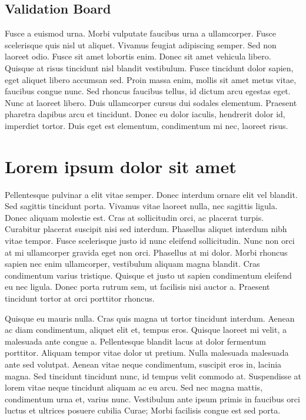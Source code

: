 \subsection{Validation Board}\label{sec:LABEL_CHP_1_SEC_B}
Fusce a euismod urna. Morbi vulputate faucibus urna a ullamcorper. Fusce scelerisque quis nisl ut aliquet. Vivamus feugiat adipiscing semper. Sed non laoreet odio. Fusce sit amet lobortis enim. Donec sit amet vehicula libero. Quisque at risus tincidunt nisl blandit vestibulum. Fusce tincidunt dolor sapien, eget aliquet libero accumsan sed. Proin massa enim, mollis sit amet metus vitae, faucibus congue nunc. Sed rhoncus faucibus tellus, id dictum arcu egestas eget. Nunc at laoreet libero. Duis ullamcorper cursus dui sodales elementum. Praesent pharetra dapibus arcu et tincidunt. Donec eu dolor iaculis, hendrerit dolor id, imperdiet tortor. Duis eget est elementum, condimentum mi nec, laoreet risus.


\section{Lorem ipsum dolor sit amet}\label{sec:LABEL_CHP_1_SEC_G}
Pellentesque pulvinar a elit vitae semper. Donec interdum ornare elit vel blandit. Sed sagittis tincidunt porta. Vivamus vitae laoreet nulla, nec sagittis ligula. Donec aliquam molestie est. Cras at sollicitudin orci, ac placerat turpis. Curabitur placerat suscipit nisi sed interdum. Phasellus aliquet interdum nibh vitae tempor. Fusce scelerisque justo id nunc eleifend sollicitudin. Nunc non orci at mi ullamcorper gravida eget non orci. Phasellus at mi dolor. Morbi rhoncus sapien nec enim ullamcorper, vestibulum aliquam magna blandit. Cras condimentum varius tristique. Quisque et justo ut sapien condimentum eleifend eu nec ligula. Donec porta rutrum sem, ut facilisis nisi auctor a. Praesent tincidunt tortor at orci porttitor rhoncus.

Quisque eu mauris nulla. Cras quis magna ut tortor tincidunt interdum. Aenean ac diam condimentum, aliquet elit et, tempus eros. Quisque laoreet mi velit, a malesuada ante congue a. Pellentesque blandit lacus at dolor fermentum porttitor. Aliquam tempor vitae dolor ut pretium. Nulla malesuada malesuada ante sed volutpat. Aenean vitae neque condimentum, suscipit eros in, lacinia magna. Sed tincidunt tincidunt nunc, id tempus velit commodo at. Suspendisse at lorem vitae neque tincidunt aliquam ac eu arcu. Sed nec magna mattis, condimentum urna et, varius nunc. Vestibulum ante ipsum primis in faucibus orci luctus et ultrices posuere cubilia Curae; Morbi facilisis congue est sed porta.

